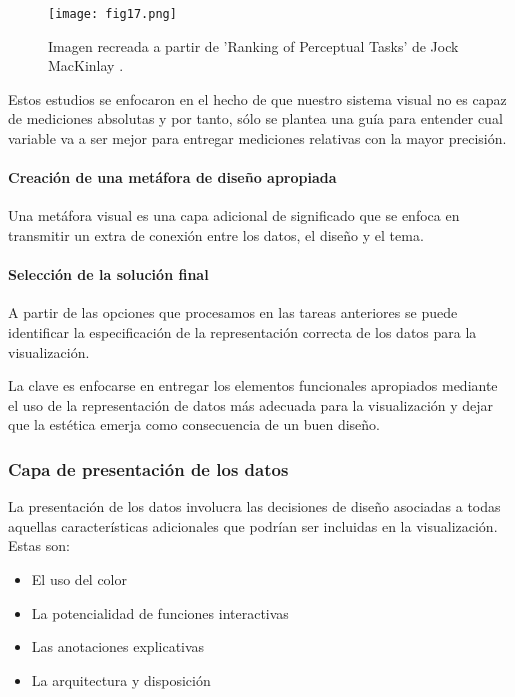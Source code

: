 \begin{figure}[htp]
  \centering
  \texttt{[image: fig17.png]}
  \caption[Ranking de las tareas perceptivas]{Imagen recreada a partir de 'Ranking of Perceptual Tasks' de Jock MacKinlay \cite{Vie04}.}
  \label{fig:fig17}
\end{figure}

Estos estudios se enfocaron en el hecho de que nuestro sistema visual no es capaz de mediciones absolutas y por tanto, sólo se plantea una guía para entender cual variable va a ser mejor para entregar mediciones relativas con la mayor precisión.

\paragraph{Creación de una metáfora de diseño apropiada}
Una metáfora visual es una capa adicional de significado que se enfoca en transmitir un extra de conexión entre los datos, el diseño y el tema.

\paragraph{Selección de la solución final}
A partir de las opciones que procesamos en las tareas anteriores se puede identificar la especificación de la representación correcta de los datos para la visualización.

La clave es enfocarse en entregar los elementos funcionales apropiados mediante el uso de la representación de datos más adecuada para la visualización y dejar que la estética emerja como consecuencia de un buen diseño.

\subsubsection{Capa de presentación de los datos}
La presentación de los datos involucra las decisiones de diseño asociadas a todas aquellas características adicionales que podrían ser incluidas en la visualización. Estas son:

\begin{itemize}
  \item El uso del color
  \item La potencialidad de funciones interactivas
  \item Las anotaciones explicativas
  \item La arquitectura y disposición
\end{itemize}

